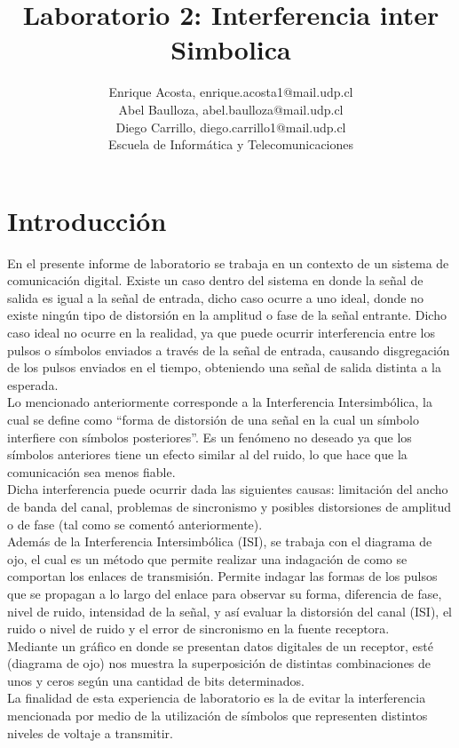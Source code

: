 \documentclass[lettersize,journal]{IEEEtran}
\begin{document}
\title{Laboratorio 2: Interferencia inter Simbolica}

\author{Enrique Acosta, enrique.acosta1@mail.udp.cl \\
Abel Baulloza, abel.baulloza@mail.udp.cl \\
Diego Carrillo, diego.carrillo1@mail.udp.cl\\

Escuela de Informática y Telecomunicaciones \\ 
}

\maketitle



\section{Introducción}\label{sec:introduccion}
En el presente informe de laboratorio se trabaja en un contexto de un sistema de comunicación digital. Existe un caso dentro del sistema en donde la señal de salida es igual a la señal de entrada, dicho caso ocurre a uno ideal, donde no existe ningún tipo de distorsión en la amplitud o fase de la señal entrante. Dicho caso ideal no ocurre en la realidad, ya que puede ocurrir interferencia entre los pulsos o símbolos enviados a través de la señal de entrada, causando disgregación de los pulsos enviados en el tiempo, obteniendo una señal de salida distinta a la esperada.\\
Lo mencionado anteriormente corresponde a la Interferencia Intersimbólica, la cual se define como ``forma de distorsión de una señal en la cual un símbolo interfiere con símbolos posteriores''. Es un fenómeno no deseado ya que los símbolos anteriores tiene un efecto similar al del ruido, lo que hace que la comunicación sea menos fiable.\\
Dicha interferencia puede ocurrir dada las siguientes causas: limitación del ancho de banda del canal, problemas de sincronismo y posibles distorsiones de amplitud o de fase (tal como se comentó anteriormente).\\
Además de la Interferencia Intersimbólica (ISI), se trabaja con el diagrama de ojo, el cual es un método que permite realizar una indagación de como se comportan los enlaces de transmisión. Permite indagar las formas de los pulsos que se propagan a lo largo del enlace para observar su forma, diferencia de fase, nivel de ruido, intensidad de la señal, y así evaluar la distorsión del canal (ISI), el ruido o nivel de ruido y el error de sincronismo en la fuente receptora. 
\cite{ref3}\\
Mediante un gráfico en donde se presentan datos digitales de un receptor, esté (diagrama de ojo) nos muestra la superposición de distintas combinaciones de unos y ceros según una cantidad de bits determinados. \\
La finalidad de esta experiencia de laboratorio es la de evitar la interferencia mencionada por medio de la utilización de símbolos que representen distintos niveles de voltaje a transmitir.
\end{document}
